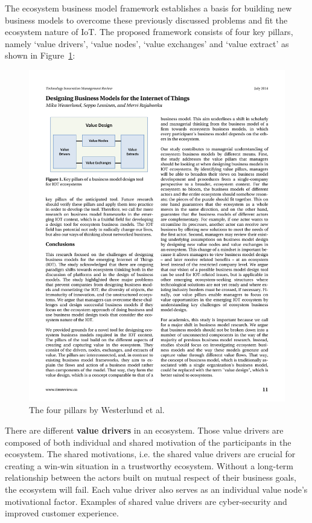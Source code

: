 		\vspace{-1em}
		The ecosystem business model framework establishes a basis for building new business models to overcome these previously discussed problems and fit the ecosystem nature of IoT. The proposed framework consists of four key pillars, namely `value drivers', `value nodes', `value exchanges' and `value extract' as shown in Figure~\ref{Westerlund pillars}:

			\begin{figure}[ht]
			    \begin{center}
			    \includegraphics[scale=1.2]{Talk11/westerlundpillars.pdf}
			    \end{center}
			    \caption{The four pillars by Westerlund et al. \cite{westerlund}}
			    \label{Westerlund pillars}
			\end{figure}
		There are different \textbf{value drivers} in an ecosystem. Those value drivers are composed of both individual and shared motivation of the participants in the ecosystem. The shared motivations, i.e. the shared value drivers are crucial for creating a win-win situation in a trustworthy ecosystem. Without a long-term relationship between the actors built on mutual respect of their business goals, the ecosystem will fail. Each value driver also serves as an individual value node's motivational factor. Examples of shared value drivers are cyber-security and improved customer experience.\\
